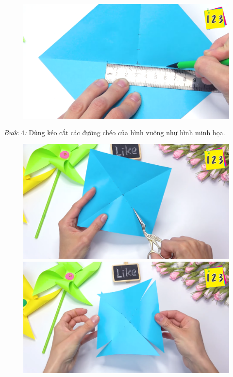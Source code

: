 \begin{multicols}{2}
\begin{figure}[H]
	\end{figure}
\begin{figure}[H]
	\vspace*{5pt}
	\centering
	\captionsetup{labelformat= empty, justification=centering}
	\includegraphics[width= 0.75\linewidth]{3b}
	\vspace*{-15pt}
\end{figure}
	\textit{Bước $4$:} Dùng kéo cắt các đường chéo của hình vuông như hình minh họa.
	\begin{figure}[H]
		\vspace*{-5pt}
		\centering
		\captionsetup{labelformat= empty, justification=centering}
		\includegraphics[width= 0.75\linewidth]{4a}
		\includegraphics[width= 0.75\linewidth]{4b}
		\vspace*{-15pt}

\end{figure}
\end{multicols}
